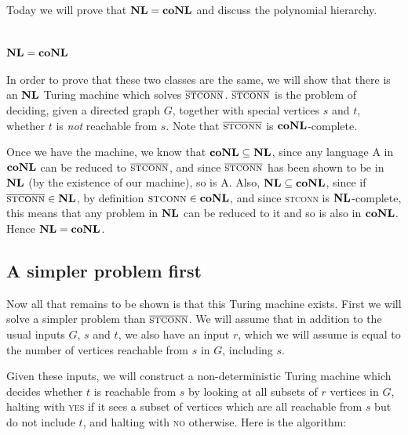 





Today we will prove that $\nl = \conl$ and discuss the polynomial hierarchy.

\section{$\nl= \conl$}

In order to prove that these two classes are the same, we will show
that there is an $\nl$ Turing machine which solves
$\overline{\textsc{stconn}}$.  $\overline{\textsc{stconn}}$ is the
problem of deciding, given a directed graph $G$, together with special
vertices $s$ and $t$, whether $t$ is \emph{not} reachable from $s$.
Note that $\overline{\textsc{stconn}}$ is $\conl$-complete.

Once we have the machine, we know that $\conl \subseteq
\nl$, since any language A in $\conl$ can be reduced to
$\overline{\textsc{stconn}}$, and since $\overline{\textsc{stconn}}$
has been shown to be in $\nl$ (by the existence of our machine), so is A.
Also, $\nl \subseteq \conl$, since if $\overline{\textsc{stconn}} \in \nl$, by
definition $\textsc{stconn} \in \conl$, and since
\textsc{stconn} is $\nl$-complete, this means that any problem in $\nl$ can
be reduced to it and so is also in $\conl$.  Hence $\nl = \conl$.

\subsection{A simpler problem first}

Now all that remains to be shown is that this Turing machine exists.
First we will solve a simpler problem than $\overline{\textsc{stconn}}$.  We will assume
that in addition to the usual inputs $G$, $s$ and $t$, we also have an input $r$, which
we will assume is equal to the number of vertices reachable from $s$ in $G$, including $s$.

Given these inputs, we will construct a non-deterministic Turing machine which decides whether $t$
is reachable from $s$ by looking at all subsets of $r$ vertices in $G$, halting with \textsc{yes}
if it sees a subset of vertices which are all reachable from $s$ but do not include $t$, and
halting with \textsc{no} otherwise.  Here is the algorithm:

